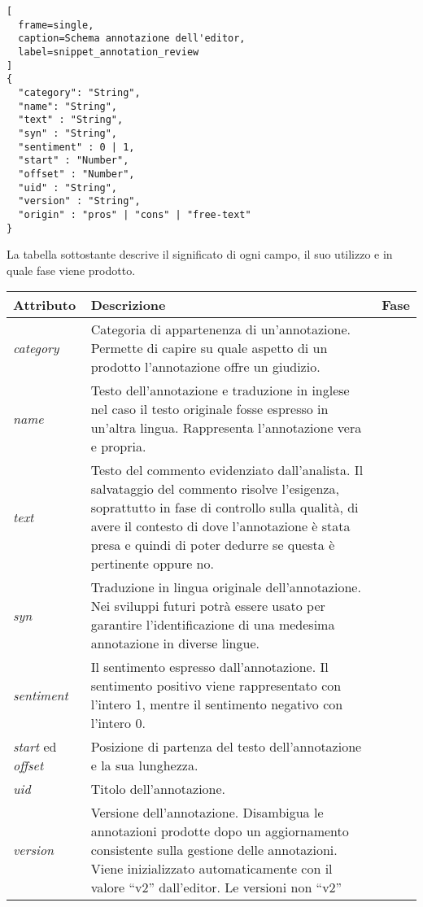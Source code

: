 \begin{center}
\begin{lstlisting}[
  frame=single,
  caption=Schema annotazione dell'editor,
  label=snippet_annotation_review
]
{
  "category": "String",
  "name": "String",
  "text" : "String",
  "syn" : "String",
  "sentiment" : 0 | 1,
  "start" : "Number",
  "offset" : "Number",
  "uid" : "String",
  "version" : "String",
  "origin" : "pros" | "cons" | "free-text"
}
\end{lstlisting}
\end{center}

La tabella sottostante descrive il significato di ogni campo, il suo utilizzo e
in quale fase viene prodotto.

\begin{center}
\begin{longtable}{|>{\centering}p{2.2cm}|p{8cm}|>{\centering}p{2.5cm}|}
\hline
\textbf{Attributo} & \textbf{Descrizione} & \textbf{Fase} \tabularnewline \hline
\textit{category} &
Categoria di appartenenza di un'annotazione. Permette di capire su quale
aspetto di un prodotto l'annotazione offre un giudizio. &
\nameref{catalogarla} \tabularnewline \hline
\textit{name} &
Testo dell'annotazione e traduzione in inglese nel caso il testo originale
fosse espresso in un'altra lingua. Rappresenta l'annotazione vera e propria. &
\nameref{riassumerla} \tabularnewline \hline
\textit{text} &
Testo del commento evidenziato dall'analista. Il salvataggio del commento
risolve l'esigenza, soprattutto in fase di controllo sulla qualità, di avere il
contesto di dove l'annotazione è stata presa e quindi di poter dedurre se questa
è pertinente oppure no. &
\nameref{evidenziarla} \tabularnewline \hline
\textit{syn} &
Traduzione in lingua originale dell'annotazione. Nei sviluppi futuri potrà
essere usato per garantire l'identificazione di una medesima annotazione in
diverse lingue. &
\nameref{riassumerla} \tabularnewline \hline
\textit{sentiment} &
Il sentimento espresso dall'annotazione. Il sentimento positivo viene
rappresentato con l'intero 1, mentre il sentimento negativo con l'intero 0. &
\nameref{sentimento} \tabularnewline \hline
\textit{start} ed \textit{offset} &
Posizione di partenza del testo dell'annotazione e la sua lunghezza. &
\nameref{evidenziarla} \tabularnewline \hline
\textit{uid} &
Titolo dell'annotazione. &
\nameref{intitolarla} \tabularnewline \hline
\textit{version} &
Versione dell'annotazione. Disambigua le annotazioni prodotte dopo un
aggiornamento consistente sulla gestione delle annotazioni. Viene inizializzato
automaticamente con il valore ``v2'' dall'editor. Le versioni non ``v2''

\end{longtable}
\end{center}
